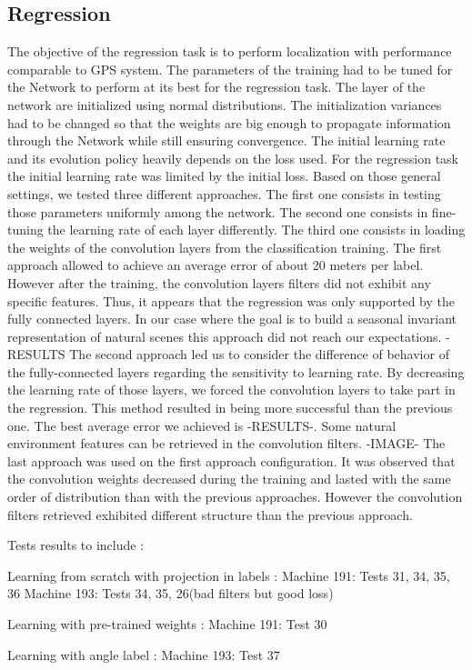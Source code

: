 \subsection{Regression}
The objective of the regression task is to perform localization with performance comparable to GPS system.
The parameters of the training had to be tuned for the Network to perform at its best for the regression task.
The layer of the network are initialized using normal distributions. The initialization variances had to be changed so that the weights are big enough to propagate information through the Network while still ensuring convergence.
The initial learning rate and its evolution policy heavily depends on the loss used. For the regression task the initial learning rate was limited by the initial loss.
Based on those general settings, we tested three different approaches. The first one consists in testing those parameters uniformly among the network. The second one consists in fine-tuning the learning rate of each layer differently. The third one consists in loading the weights of the convolution layers from the classification training.
The first approach allowed to achieve an average error of about 20 meters per label. However after the training, the convolution layers filters did not exhibit any specific features. Thus, it appears that the regression was only supported by the fully connected layers. In our case where the goal is to build a seasonal invariant representation of natural scenes this approach did not reach our expectations.
-RESULTS
The second approach led us to consider the difference of behavior of the fully-connected layers regarding the sensitivity to learning rate. By decreasing the learning rate of those layers, we forced the convolution layers to take part in the regression. This method resulted in being more successful than the previous one. The best average error we achieved is -RESULTS-. Some natural environment features can be retrieved in the convolution filters.
-IMAGE-
The last approach was used on the first approach configuration. It was observed that the convolution weights decreased during the training and lasted with the same order of distribution than with the previous approaches. However the convolution filters retrieved exhibited different structure than the previous approach.

Tests results to include :

Learning from scratch with projection in labels :
Machine 191: Tests 31, 34, 35, 36
Machine 193: Tests 34, 35, 26(bad filters but good loss)

Learning with pre-trained weights :
Machine 191: Test 30

Learning with angle label :
Machine 193: Test 37
